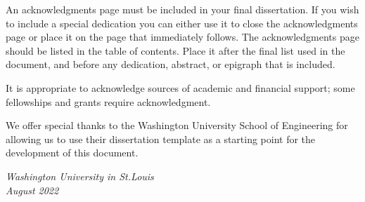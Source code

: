 \thesisacknowledgments

An acknowledgments page must be included in your final dissertation.
If you wish to include a special dedication you can either use it to close the acknowledgments page or place it on the page that immediately follows.
The acknowledgments page should be listed in the table of contents.
Place it after the final list used in the document, and before any dedication, abstract, or epigraph that is included.

\noindent It is appropriate to acknowledge sources of academic and financial support; some fellowships and grants require acknowledgment.

\noindent We offer special thanks to the Washington University School of Engineering for allowing us to use their dissertation template as a starting point for the development of this document.

\null\hfill \thesisauthor

\noindent
\textit{Washington University in St.\@ Louis}\\
\textit{August 2022}
